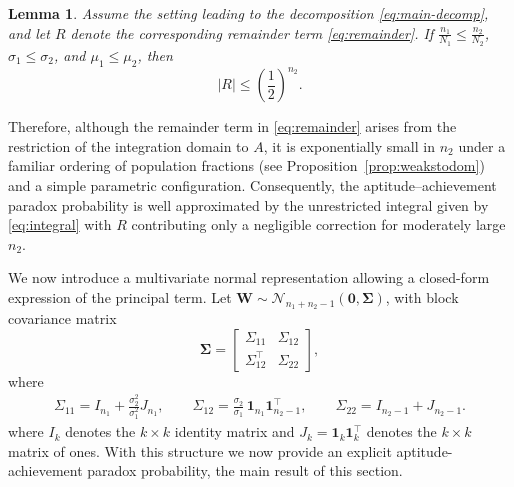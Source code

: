\documentclass[12pt]{article}
\newtheorem{lemma}[theorem]{Lemma}
\begin{document}
\begin{lemma}
\label{lemma:Rbound}
Assume the setting leading to the decomposition
\eqref{eq:main-decomp}, and let $R$ denote the corresponding
remainder term \eqref{eq:remainder}. If
$\frac{n_1}{N_1}\le\frac{n_2}{N_2}$, $\sigma_1\le\sigma_2$, and $\mu_1\le\mu_2$,
then
\begin{equation} \label{eq:remainder-bound}
  |R| \leq \left(\frac{1}{2}\right)^{n_2}.
\end{equation}
\end{lemma}

Therefore, although the remainder term in \eqref{eq:remainder} arises from the restriction of the integration domain to $A$, it is exponentially small in $n_2$ under a familiar ordering of population fractions (see Proposition~\ref{prop:weakstodom}) and a simple parametric configuration. Consequently, the aptitude--achievement paradox probability is well approximated by the unrestricted integral given by \eqref{eq:integral} with $R$ contributing only a negligible correction for moderately large $n_2$. 

We now introduce a multivariate normal representation allowing a closed-form expression of the principal term. Let $\mathbf{W} \sim \mathcal{N}_{n_1+n_2-1}(\mathbf{0}, \boldsymbol{\Sigma})$, with block covariance matrix
\begin{equation}\label{eq:Sigma}
\boldsymbol{\Sigma} =
\begin{bmatrix}
\Sigma_{11} & \Sigma_{12} \\
\Sigma_{12}^\top & \Sigma_{22}
\end{bmatrix},
\end{equation}
where
\begin{align}\label{eq:Sigmastructure}
\Sigma_{11} = I_{n_1} + \frac{\sigma_2^2}{\sigma_1^2} J_{n_1}, 
\qquad
\Sigma_{12} = \frac{\sigma_2}{\sigma_1} \, \mathbf{1}_{n_1} \mathbf{1}_{n_2-1}^\top, 
\qquad
\Sigma_{22} = I_{n_2-1} + J_{n_2-1}.
\end{align}
where $I_k$ denotes the $k \times k$ identity matrix and $J_k = \mathbf{1}_k \mathbf{1}_k^\top$ denotes the $k \times k$ matrix of ones. With this structure we now provide an explicit aptitude-achievement paradox probability, the main result of this section. %
\end{document}

